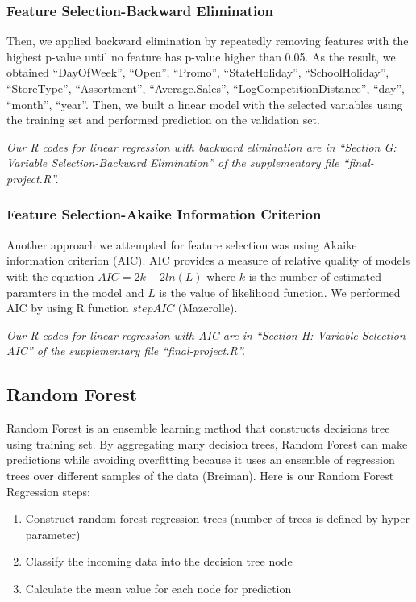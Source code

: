 \documentclass[letterpaper,twocolumn,11pt]{article}
\begin{document}
\subsubsection{Feature Selection-Backward Elimination}
Then, we applied backward elimination by repeatedly removing features with the highest p-value until no feature has p-value higher than 0.05. As the result, we obtained ``DayOfWeek'', ``Open'', ``Promo'', ``StateHoliday'', ``SchoolHoliday'', ``StoreType'', ``Assortment'', ``Average.Sales'', ``LogCompetitionDistance'', ``day'', ``month'', ``year''. Then, we built a linear model with the selected variables using the training set and performed prediction on the validation set.

\textit{Our R codes for linear regression with backward elimination are in ``Section G: Variable Selection-Backward Elimination'' of the supplementary file ``final-project.R''.}

\subsubsection{Feature Selection-Akaike Information Criterion}
Another approach we attempted for feature selection was using Akaike information criterion (AIC). AIC provides a measure of relative quality of models with the equation $AIC = 2k - 2 ln(L)$ where $k$ is the number of estimated paramters in the model and $L$ is the value of likelihood function. We performed AIC by using R function $stepAIC$ (Mazerolle).

\textit{Our R codes for linear regression with AIC are in ``Section H: Variable Selection-AIC'' of the supplementary file ``final-project.R''.}

\subsection{Random Forest}
Random Forest is an ensemble learning method that constructs decisions tree using training set. By aggregating many decision trees, Random Forest can make predictions while avoiding overfitting because it uses an ensemble of regression trees over different samples of the data (Breiman). Here is our Random Forest Regression steps: \\
\begin{enumerate}
\item Construct random forest regression trees (number of trees is defined by hyper parameter)
\item Classify the incoming data into the decision tree node
\item Calculate the mean value for each node for prediction
\end{enumerate}
\end{document}
